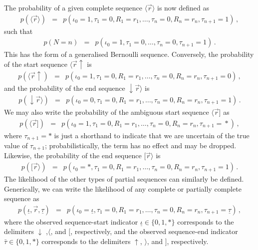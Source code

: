 \documentclass[a4paper]{article}
\newcommand{\up}{\!\uparrow}
\newcommand{\dn}{\downarrow\!}
\begin{document}
The probability of a given complete sequence $\langle\vec{r}\rangle$ is now defined as
\begin{eqnarray}
   p(\langle\vec{r}\rangle)
& = & p(\iota_0\!=\!1,\tau_1\!=\!0,R_1=r_1,\ldots,\tau_n\!=\!0,R_n=r_n,\tau_{n+1}\!=\!1)
\,,
\end{eqnarray}
such that 
\begin{eqnarray}
   p(N\!=\!n) & = &  p(\iota_0\!=\!1,\tau_1\!=\!0,\ldots,\tau_n\!=\!0,\tau_{n+1}\!=\!1)\,.
\end{eqnarray}
This has the form of a generalised Bernoulli sequence.
Conversely, the probability of the start sequence $\langle\vec{r}\up$ is
\begin{eqnarray}
p(\langle\vec{r}\up) 
& = & p(\iota_0\!=\!1,\tau_1\!=\!0,R_1\!=\!r_1,\ldots,\tau_n\!=\!0,R_n\!=\!r_n,\tau_{n+1}\!=\!0)\,,
\end{eqnarray}
and the probability of the end sequence $\dn\vec{r}\rangle$ is
\begin{eqnarray}
p(\dn\vec{r}\rangle)
& = & p(\iota_0\!=\!0,\tau_1\!=\!0,R_1\!=\!r_1,\ldots,\tau_n\!=\!0,R_n\!=\!r_n,\tau_{n+1}\!=\!1)\,.
\end{eqnarray}
We may also write the probability of the ambiguous start sequence $\langle\vec{r}]$ as
\begin{eqnarray}
p(\langle\vec{r}]) 
& = & p(\iota_0\!=\!1,\tau_1\!=\!0,R_1\!=\!r_1,\ldots,\tau_n\!=\!0,R_n\!=\!r_n,\tau_{n+1}\!=\!*)\,,
\end{eqnarray}
where $\tau_{n+1}=*$ is just a shorthand to indicate that we are uncertain of the true value of $\tau_{n+1}$;
probabilistically, the term has no effect and may be dropped.
Likewise, the probability of the end sequence $[\vec{r}\rangle$ is
\begin{eqnarray}
p([\vec{r}\rangle)
& = & p(\iota_0\!=\!*,\tau_1\!=\!0,R_1\!=\!r_1,\ldots,\tau_n\!=\!0,R_n\!=\!r_n,\tau_{n+1}\!=\!1)\,.
\end{eqnarray}
The likelihood of the other types of partial sequences can similarly be defined.
Generically, we can write the likelihood of any complete or partially complete sequence as
\begin{eqnarray}
p(\underline{\iota},\vec{r},\underline{\tau})
& = & p(\iota_0\!=\!\underline{\iota},\tau_1\!=\!0,R_1\!=\!r_1,\ldots,\tau_n\!=\!0,R_n\!=\!r_n,\tau_{n+1}\!=\!\underline{\tau})\,,
\end{eqnarray}
where the observed sequence-start indicator $\underline{\iota}\in\{0,1,*\}$ corresponds to the delimiters
$\downarrow$ ,$\langle$, and $[$, respectively, and the observed sequence-end indicator
$\bar{\tau}\in\{0,1,*\}$ corresponds to the delimiters $\uparrow$, $\rangle$, and $]$, respectively.
\end{document}

